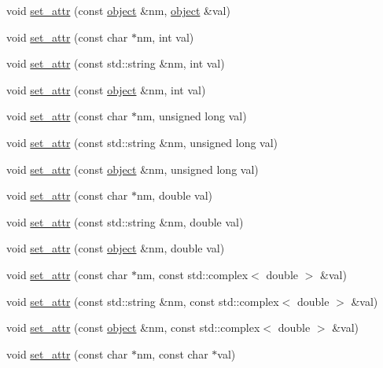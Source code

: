 \begin{DoxyCompactItemize}
void \hyperlink{classpy_1_1object_a3f56dd56b51a65c66f747d1bbdec7eb7}{set\+\_\+attr} (const \hyperlink{classpy_1_1object}{object} \&nm, \hyperlink{classpy_1_1object}{object} \&val)
\item 
void \hyperlink{classpy_1_1object_a2f4d93d95109181fcd358609bada846a}{set\+\_\+attr} (const char $\ast$nm, int val)
\item 
void \hyperlink{classpy_1_1object_a6a6f0944e50d3d96e82436d59e54f579}{set\+\_\+attr} (const std\+::string \&nm, int val)
\item 
void \hyperlink{classpy_1_1object_a43c2e7a4f455f11e7ee8c22dffd7527c}{set\+\_\+attr} (const \hyperlink{classpy_1_1object}{object} \&nm, int val)
\item 
void \hyperlink{classpy_1_1object_a56863f72820985b98008d42798631fbc}{set\+\_\+attr} (const char $\ast$nm, unsigned long val)
\item 
void \hyperlink{classpy_1_1object_af3b12251dccb1f3e17e075b9ab97f6b9}{set\+\_\+attr} (const std\+::string \&nm, unsigned long val)
\item 
void \hyperlink{classpy_1_1object_a909bf6ec3b4ff695a64b9e7c8d2d8c16}{set\+\_\+attr} (const \hyperlink{classpy_1_1object}{object} \&nm, unsigned long val)
\item 
void \hyperlink{classpy_1_1object_a02eb751093ff968557e017957c2e3765}{set\+\_\+attr} (const char $\ast$nm, double val)
\item 
void \hyperlink{classpy_1_1object_ab75c57ef750d57336b0eddfa6d4da98e}{set\+\_\+attr} (const std\+::string \&nm, double val)
\item 
void \hyperlink{classpy_1_1object_a2ec218a8b4f8003368ac13085390d434}{set\+\_\+attr} (const \hyperlink{classpy_1_1object}{object} \&nm, double val)
\item 
void \hyperlink{classpy_1_1object_adf1b24c299f5c754726dcd5f4dcf11d3}{set\+\_\+attr} (const char $\ast$nm, const std\+::complex$<$ double $>$ \&val)
\item 
void \hyperlink{classpy_1_1object_af02b1b168d2af0cf018be3742d902ca3}{set\+\_\+attr} (const std\+::string \&nm, const std\+::complex$<$ double $>$ \&val)
\item 
void \hyperlink{classpy_1_1object_a9d65f5b8e85436340f9a097ed111daaa}{set\+\_\+attr} (const \hyperlink{classpy_1_1object}{object} \&nm, const std\+::complex$<$ double $>$ \&val)
\item 
void \hyperlink{classpy_1_1object_a1dbed4a576beaac576840ebc196904bc}{set\+\_\+attr} (const char $\ast$nm, const char $\ast$val)
\item 

\end{DoxyCompactItemize}

